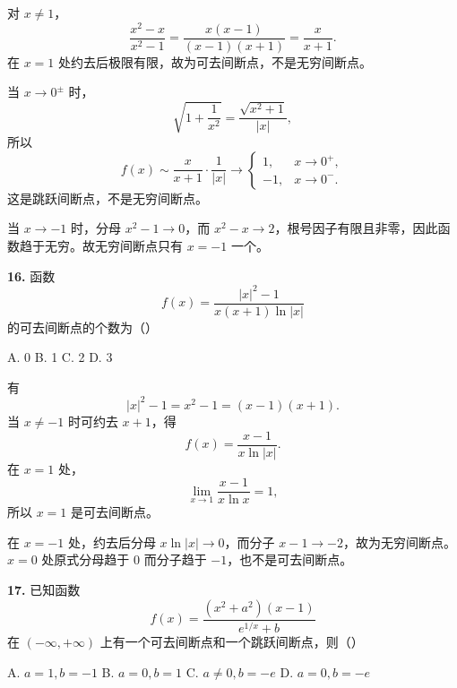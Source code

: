 \begin{solutionblock}
对 \(x\ne1\)，
\[
\frac{x^2-x}{x^2-1}
=\frac{x(x-1)}{(x-1)(x+1)}
=\frac{x}{x+1}.
\]
在 \(x=1\) 处约去后极限有限，故为可去间断点，不是无穷间断点。

当 \(x\to0^\pm\) 时，
\[
\sqrt{1+\frac1{x^2}}=\frac{\sqrt{x^2+1}}{|x|},
\]
所以
\[
f(x)\sim \frac{x}{x+1}\cdot\frac1{|x|}
\to
\begin{cases}
1,&x\to0^+,\\
-1,&x\to0^-.
\end{cases}
\]
这是跳跃间断点，不是无穷间断点。

当 \(x\to-1\) 时，分母 \(x^2-1\to0\)，而 \(x^2-x\to2\)，根号因子有限且非零，因此函数趋于无穷。故无穷间断点只有 \(x=-1\) 一个。

\end{solutionblock}

\begin{problemblock}
\textbf{16.} 函数
\[
f(x)=\frac{|x|^2-1}{x(x+1)\ln|x|}
\]
的可去间断点的个数为（\quad）

A. 0 \qquad B. 1 \qquad C. 2 \qquad D. 3
\end{problemblock}

\begin{solutionblock}
有
\[
|x|^2-1=x^2-1=(x-1)(x+1).
\]
当 \(x\ne-1\) 时可约去 \(x+1\)，得
\[
f(x)=\frac{x-1}{x\ln|x|}.
\]
在 \(x=1\) 处，
\[
\lim_{x\to1}\frac{x-1}{x\ln x}=1,
\]
所以 \(x=1\) 是可去间断点。

在 \(x=-1\) 处，约去后分母 \(x\ln|x|\to0\)，而分子 \(x-1\to-2\)，故为无穷间断点。\(x=0\) 处原式分母趋于 0 而分子趋于 \(-1\)，也不是可去间断点。

\end{solutionblock}

\begin{problemblock}
\textbf{17.} 已知函数
\[
f(x)=\frac{(x^2+a^2)(x-1)}{e^{1/x}+b}
\]
在 \((-\infty,+\infty)\) 上有一个可去间断点和一个跳跃间断点，则（\quad）

A. \(a=1,b=-1\) \qquad B. \(a=0,b=1\) \qquad C. \(a\ne0,b=-e\) \qquad D. \(a=0,b=-e\)
\end{problemblock}

